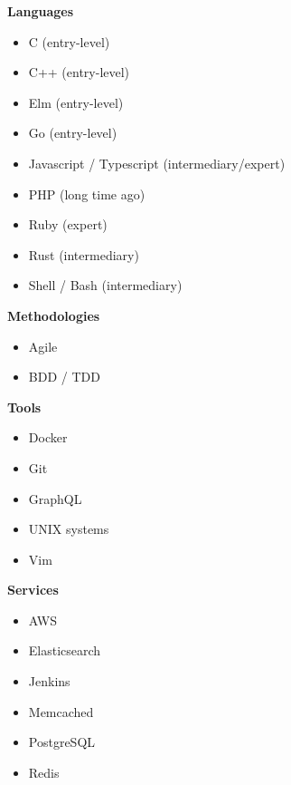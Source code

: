 \documentclass[9pt]{developercv} %
\begin{document}
\begin{minipage}[t]{0.3\textwidth} %
	\vspace{-\baselineskip}

  \textbf{Languages}
  \begin{itemize}
      \item C {\footnotesize (entry-level)}
      \item C++ {\footnotesize (entry-level)}
      \item Elm {\footnotesize (entry-level)}
      \item Go {\footnotesize (entry-level)}
      \item Javascript / Typescript {\footnotesize (intermediary/expert)}
      \item PHP {\footnotesize (long time ago)}
      \item Ruby {\footnotesize (expert)}
      \item Rust {\footnotesize (intermediary)}
      \item Shell / Bash {\footnotesize (intermediary)}
  \end{itemize}
\end{minipage}
\hfill
\begin{minipage}[t]{0.3\textwidth}
	\vspace{-\baselineskip}

  \textbf{Methodologies}
  \begin{itemize}
      \item Agile
      \item BDD / TDD
  \end{itemize}

  \textbf{Tools}
  \begin{itemize}
      \item Docker
      \item Git
      \item GraphQL
      \item UNIX systems
      \item Vim
  \end{itemize}
\end{minipage}
\hfill
\begin{minipage}[t]{0.3\textwidth}
	\vspace{-\baselineskip}

  \textbf{Services}
  \begin{itemize}
      \item AWS
      \item Elasticsearch
      \item Jenkins
      \item Memcached
      \item PostgreSQL
      \item Redis
  \end{itemize}
\end{minipage}

\end{document}

